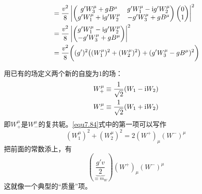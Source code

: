 \begin{equation}
\begin{aligned}
& = \frac{v^2}{8} \left|\begin{pmatrix}
g'W_3^\mu+gB^\mu & g'W_1^\mu-\mathrm i g'W_2^\mu \\ g'W_1^\mu+\mathrm i g'W_2^\mu & -g'W_3^\mu+gB^\mu
\end{pmatrix}\begin{pmatrix} 0 \\ 1 \end{pmatrix}\right|^2 \\
& = \frac{v^2}{8} \left|\begin{pmatrix}
g'W_1^\mu-\mathrm i g'W_2^\mu \\  -g'W_3^\mu+gB^\mu
\end{pmatrix}\right|^2 \\
& = \frac{v^2}{8} \bigg( (g')^2 \big((W_1^\mu)^2+ (W_2^\mu)^2 \big) +  (g'W_3^\mu-gB^\mu)^2 \bigg)
\end{aligned}
\label{equ7.84}
\end{equation}

用已有的场定义两个新的自旋为$1$的场：
\begin{align}
\label{equ7.85}
W_+^\mu &\equiv \frac{1}{\sqrt{2}}(W_1-\mathrm i W_2) \\
\label{equ7.86}
W_-^\mu &\equiv \frac{1}{\sqrt{2}}(W_1+\mathrm i W_2)
\end{align}
即$W_+^\mu$是$W_-^\mu$的复共轭。\eqref{equ7.84}式中的第一项可以写作
\begin{equation}
\label{equ7.87}
(W_1^\mu)^2+ (W_2^\mu)^2 = 2 (W^+)_\mu(W^-)^\mu
\end{equation}
把前面的常数添上，有
\begin{equation}
\label{equ7.88}
\left(\underbrace{\frac{g'v}{2}}_{\equiv m_W}\right)(W^+)_\mu(W^-)^\mu
\end{equation}
这就像一个典型的“质量”项。

